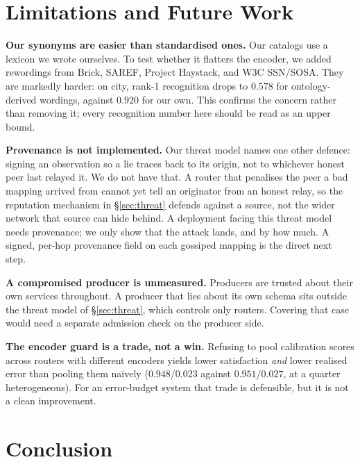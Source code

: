 \documentclass[conference]{IEEEtran}
\begin{document}
		\section{Limitations and Future Work}
		\label{sec:limits}
		
		\textbf{Our synonyms are easier than standardised ones.} Our catalogs use
		a lexicon we wrote ourselves. To test whether it flatters the encoder, we
		added rewordings from Brick, SAREF, Project Haystack, and W3C SSN/SOSA.
		They are markedly harder: on city, rank-1 recognition drops to $0.578$ for
		ontology-derived wordings, against $0.920$ for our own. This confirms the
		concern rather than removing it; every recognition number here should be
		read as an upper bound.
		
		\textbf{Provenance is not implemented.} Our threat model names one other
		defence: signing an observation so a lie traces back to its origin, not to
		whichever honest peer last relayed it. We do not have that. A router that
		penalises the peer a bad mapping arrived from cannot yet tell an
		originator from an honest relay, so the reputation mechanism in
		\S\ref{sec:threat} defends against a source, not the wider network that
		source can hide behind. A deployment facing this threat model needs
		provenance; we only show that the attack lands, and by how much. A
		signed, per-hop provenance field on each gossiped mapping is the direct
		next step.
		
		\textbf{A compromised producer is unmeasured.} Producers are trusted
		about their own services throughout. A producer that lies about its own
		schema sits outside the threat model of \S\ref{sec:threat}, which
		controls only routers. Covering that case would need a separate admission
		check on the producer side.
		
		\textbf{The encoder guard is a trade, not a win.} Refusing to pool
		calibration scores across routers with different encoders yields lower
		satisfaction \emph{and} lower realised error than pooling them naively
		($0.948$/$0.023$ against $0.951$/$0.027$, at a quarter heterogeneous). For
		an error-budget system that trade is defensible, but it is not a clean
		improvement.
		
		\section{Conclusion}
		\label{sec:conclusion}
		
\end{document}
